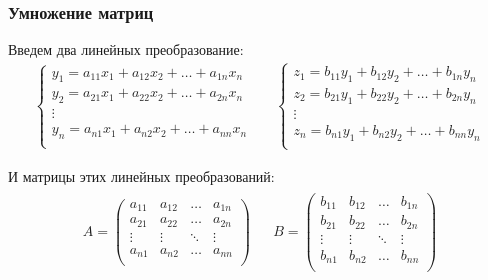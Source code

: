 \documentclass[class=article,a4paper,12pt,crop=false]{standalone}
\begin{document}
\subsubsection{Умножение матриц}

Введем два линейных преобразование:
\begin{equation}
    \begin{aligned}
        \begin{cases}
            y_1 = a_{11}x_1 + a_{12}x_2 + \dots + a_{1n}x_n\\
            y_2 = a_{21}x_1 + a_{22}x_2 + \dots + a_{2n}x_n\\
            \vdots \\
            y_n = a_{n1}x_1 + a_{n2}x_2 + \dots + a_{nn}x_n\\
        \end{cases} & &
        \begin{cases}
            z_1 = b_{11}y_1 + b_{12}y_2 + \dots + b_{1n}y_n\\
            z_2 = b_{21}y_1 + b_{22}y_2 + \dots + b_{2n}y_n\\
            \vdots \\
            z_n = b_{n1}y_1 + b_{n2}y_2 + \dots + b_{nn}y_n\\
        \end{cases}
    \end{aligned}
\end{equation}

И матрицы этих линейных преобразований:
\begin{eqnarray}
    \begin{aligned}
        A = \begin{pmatrix}
            a_{11} & a_{12} & \dots & a_{1n} \\
            a_{21} & a_{22} & \dots & a_{2n} \\
            \vdots & \vdots & \ddots & \vdots \\
            a_{n1} & a_{n2} & \dots & a_{nn} \\
        \end{pmatrix} & &
        B = \begin{pmatrix}
            b_{11} & b_{12} & \dots & b_{1n} \\
            b_{21} & b_{22} & \dots & b_{2n} \\
            \vdots & \vdots & \ddots & \vdots \\
            b_{n1} & b_{n2} & \dots & b_{nn} \\
        \end{pmatrix}
    \end{aligned}
\end{eqnarray}
\end{document}
